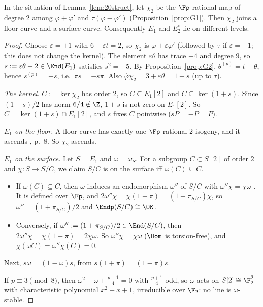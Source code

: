\begin{lemma}\label{lem:20vertical}
In the situation of Lemma~\ref{lem:20struct}, let $\chi_2$ be the $\Fp$-rational map of degree $2$
among $\varphi+\varphi'$ and $\tau(\varphi-\varphi')$ (Proposition~\ref{prop:G1}).  Then $\chi_2$
joins a floor curve and a surface curve.  Consequently $E_1$ and $E_2^\circ$ lie on different levels.
\end{lemma}
\begin{proof}
Choose $\varepsilon=\pm1$ with $6+\varepsilon t=2$, so $\chi_2$ is $\varphi+\varepsilon\varphi'$ (followed
by $\tau$ if $\varepsilon=-1$; this does not change the kernel).  The element $\varepsilon\theta$ has
trace $-4$ and degree $9$, so $s:=\varepsilon\theta+2\in\End(E_1)$ satisfies $s^2=-5$.  By
Proposition~\ref{prop:G2}, $\theta^{(p)}=t-\theta$, hence $s^{(p)}=-s$, i.e.\ $\pi s=-s\pi$.  Also
$\widehat\varphi\chi_2=3+\varepsilon\theta=1+s$ (up to $\tau$).

\emph{The kernel.}  $C:=\ker\chi_2$ has order $2$, so $C\subseteq E_1[2]$ and $C\subseteq\ker(1+s)$.
Since $(1+s)/2$ has norm $6/4\notin\Z$, $1+s$ is not zero on $E_1[2]$.  So $C=\ker(1+s)\cap E_1[2]$,
and $s$ fixes $C$ pointwise ($sP=-P=P$).

\emph{$E_1$ on the floor.}  A floor curve has exactly one $\Fp$-rational $2$-isogeny, and it
ascends \cite[Thm.~2.7(2)]{DG}, p.~8.  So $\chi_2$ ascends.

\emph{$E_1$ on the surface.}  Let $S=E_1$ and $\omega=\omega_S$.  For a subgroup $C\subset S[2]$ of
order $2$ and $\chi:S\to S/C$, we claim $S/C$ is on the surface iff $\omega(C)\subseteq C$.
\begin{itemize}
\item If $\omega(C)\subseteq C$, then $\omega$ induces an endomorphism $\omega''$ of $S/C$ with
  $\omega''\chi=\chi\omega$ \cite[Cor.~III.4.11]{Silverman}.  It is defined over $\Fp$, and
  $2\omega''\chi=\chi(1+\pi)=(1+\pi_{S/C})\chi$, so $\omega''=(1+\pi_{S/C})/2$ and
  $\Endp(S/C)\cong\OK$.
\item Conversely, if $\omega'':=(1+\pi_{S/C})/2\in\End(S/C)$, then $2\omega''\chi=\chi(1+\pi)=2\chi\omega$.
  So $\omega''\chi=\chi\omega$ ($\Hom$ is torsion-free), and $\chi(\omega C)=\omega''\chi(C)=0$.
\end{itemize}
Next, $s\omega=(1-\omega)s$, from $s(1+\pi)=(1-\pi)s$.

If $p\equiv3\pmod8$, then $\omega^2-\omega+\frac{p+1}4=0$ with $\frac{p+1}4$ odd, so $\omega$ acts on
$S[2]\cong\F_2^2$ with characteristic polynomial $x^2+x+1$, irreducible over $\F_2$: no line is
$\omega$-stable.


\end{proof}

